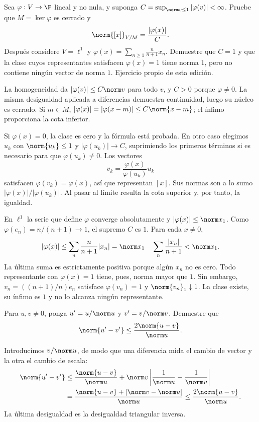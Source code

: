 \begin{ejercicio}\label{ej:ampl-cocientes-5}
Sea $\varphi:V\to\F$ lineal y no nula, y suponga
$C=\sup_{\norm v\le1}|\varphi(v)|<\infty$. Pruebe que $M=\ker\varphi$ es cerrado y
\[
 \norm{[x]}_{V/M}=\frac{|\varphi(x)|}{C}.
\]
Después considere $V=\ell^1$ y $\varphi(x)=\sum_{n\ge1}\frac{n}{n+1}x_n$. Demuestre que $C=1$ y que la clase cuyos representantes satisfacen $\varphi(x)=1$ tiene norma $1$, pero no contiene ningún vector de norma $1$. Ejercicio propio de esta edición.
\end{ejercicio}
\begin{solucion}
La homogeneidad da $|\varphi(v)|\le C\norm v$ para todo $v$, y $C>0$ porque $\varphi\ne0$. La misma desigualdad aplicada a diferencias demuestra continuidad, luego su núcleo es cerrado. Si $m\in M$,
$|\varphi(x)|=|\varphi(x-m)|\le C\norm{x-m}$; el ínfimo proporciona la cota inferior.

Si $\varphi(x)=0$, la clase es cero y la fórmula está probada. En otro caso elegimos $u_k$ con $\norm{u_k}\le1$ y $|\varphi(u_k)|\to C$, suprimiendo los primeros términos si es necesario para que $\varphi(u_k)\ne0$. Los vectores
\[
 v_k=\frac{\varphi(x)}{\varphi(u_k)}u_k
\]
satisfacen $\varphi(v_k)=\varphi(x)$, así que representan $[x]$. Sus normas son a lo sumo $|\varphi(x)|/|\varphi(u_k)|$. Al pasar al límite resulta la cota superior y, por tanto, la igualdad.

En $\ell^1$ la serie que define $\varphi$ converge absolutamente y $|\varphi(x)|\le\norm x_1$. Como $\varphi(e_n)=n/(n+1)\to1$, el supremo $C$ es $1$. Para cada $x\ne0$,
\[
 |\varphi(x)|\le\sum_n\frac{n}{n+1}|x_n|
 =\norm x_1-\sum_n\frac{|x_n|}{n+1}<\norm x_1.
\]
La última suma es estrictamente positiva porque algún $x_n$ no es cero. Todo representante con $\varphi(x)=1$ tiene, pues, norma mayor que $1$. Sin embargo, $v_n=((n+1)/n)e_n$ satisface $\varphi(v_n)=1$ y $\norm{v_n}_1\downarrow1$. La clase existe, su ínfimo es $1$ y no lo alcanza ningún representante.
\end{solucion}

\begin{ejercicio}\label{ej:lectura-19-1}
Para $u,v\ne0$, ponga $u'=u/\norm u$ y $v'=v/\norm v$. Demuestre que
\[\norm{u'-v'}\leq\frac{2\norm{u-v}}{\norm u}.\]
\end{ejercicio}
\begin{solucion}
Introducimos $v/\norm u$, de modo que una diferencia mida el cambio de vector y la otra el cambio de escala:
\begin{align*}
 \norm{u'-v'}
 &\leq\frac{\norm{u-v}}{\norm u}
 +\norm v\left|\frac1{\norm u}-\frac1{\norm v}\right|\\
 &=\frac{\norm{u-v}+|\norm v-\norm u|}{\norm u}
 \leq\frac{2\norm{u-v}}{\norm u}.
\end{align*}
La última desigualdad es la desigualdad triangular inversa.
\end{solucion}

